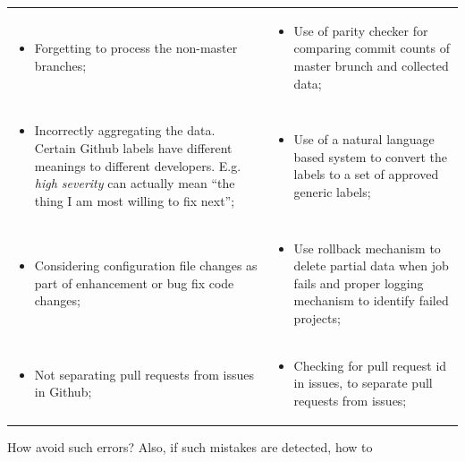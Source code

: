 \begin{table}[!t]
{\begin{tabular}{|p{.45\linewidth}p{.50\linewidth}|}
\rowcolor{blue!10}
\small \begin{itemize} 
\item
Forgetting to process the non-master branches;
\end{itemize} & \begin{itemize} 
\item
Use of parity checker for comparing commit counts of master brunch and collected data;
\end{itemize} \\

\rowcolor{white!10}
\small \begin{itemize} 
\item
Incorrectly aggregating the data. Certain Github labels have different meanings to different developers. E.g. {\em high severity} can actually mean ``the thing I am most willing to fix next'';
\end{itemize} & \begin{itemize} 
\item
Use of a natural language based system to convert the labels to a set of approved generic labels;
\end{itemize} \\

\rowcolor{blue!10}
\small \begin{itemize} 
\item
Considering configuration file changes as part of enhancement or bug fix code changes;
\end{itemize} & \begin{itemize} 
\item
Use rollback mechanism to delete partial data when job fails and proper logging mechanism to identify failed projects;
\end{itemize} \\

\rowcolor{white!10}
\small \begin{itemize} 
\item
Not separating pull requests from issues in Github;
\end{itemize} & \begin{itemize} 
\item
Checking for pull request id in issues, to separate pull requests from issues;
\end{itemize} \\\hline

\end{tabular}}
\end{table}
How avoid such errors? Also,  if such mistakes are detected, how to
